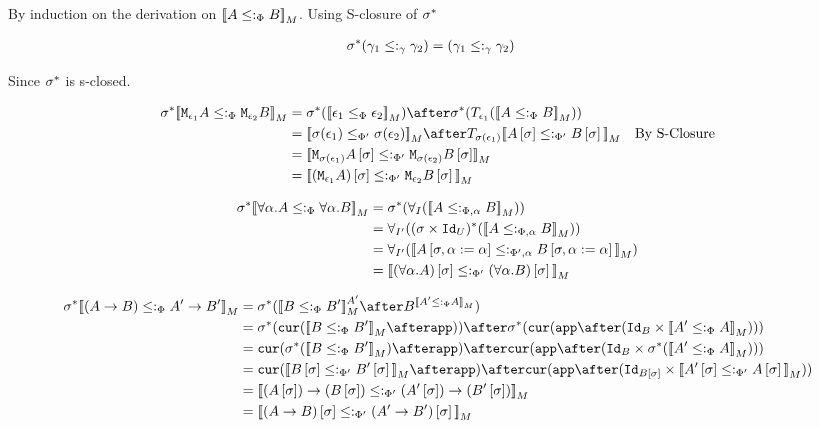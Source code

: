 \documentclass{report}
\newcommand{\allI}[0]{\forall_I}
\newcommand{\allII}[0]{\forall_{I'}}
\renewcommand\star[0]{^*}
\newcommand\subtypeg[0]{\subtype_\g}
\newcommand\subtypepa[0]{\subtype_{\P, \a}}
\newcommand\subtypeppa[0]{\subtype_{\P', \a}}
\begin{document}
\proof
By induction on the derivation on ${\bf [\![}A\leq:_\Phi B{\bf ]\!]}_M$. Using S-closure of $\si\star$ 

\begin{align}
    \si\star(\g_1\subtypeg\g_2) &= (\g_1\subtypeg\g_2)
\end{align}

Since $\si\star$ is s-closed.

\begin{align}
    \si\star\deno{\M{\e_1}{A} \subtypep \M{\e_2}{B}} & = \si\star(\deno{\e_1\subeffectp\e_2})\after\si\star(\T{\e_1}(\deno{A\subtypep B})) \\ 
     &= \deno{\si(\e_1)\subeffectpp\si(\e_2)} \after \T{\si(\e_1)}{\deno{A\ssi\subtypepp B\ssi}}\qt{By S-Closure}\\
     &= \deno{\M{\si(\e_1)}{A\ssi}\subtypepp\M{\si(\e_2)}{B\ssi}}\\
     &= \deno{(\M{\e_1}{A})\ssi\subtypepp\M{\e_2}{B}\ssi}\\
\end{align}

    \begin{align}
        \si\star\deno{\all{\a}{A}\subtypep\all{\a}{B}} &= \si\star(\allI(\deno{A\subtypepa B})) \\
        &=\allII((\si\times\Id{U})\star(\deno{A\subtypepa B}))\\
        &=\allII(\deno{A\sub{\si,\a\setto\a}\subtypeppa B\sub{\si,\a\setto\a}})\\
        &= \deno{(\all{\a}{A})\ssi \subtypepp(\all{\a}{B})\ssi}\\
    \end{align}

\begin{align}
    \si\star\deno{(\ab)\subtypep\fntype{A'}{B'}} &= \si\star(\deno{B\subtypep B'}^{A'}\after B^{\deno{A'\subtypep A}})\\
    &= \si\star(\cur{\deno{B\subtypep B'}\after\app})\after\si\star(\cur{\app\after(\Id{B}\times\deno{A'\subtypep A})})\\
    & = \cur{\si\star(\deno{B\subtypep B'})\after\app}\after\cur{\app\after(\Id{B}\times\si\star(\deno{A'\subtypep A}))}\\
    & = \cur{\deno{B\ssi\subtypepp B'\ssi}\after\app}\after\cur{\app\after(\Id{B\ssi}\times\deno{A'\ssi\subtypepp A\ssi})}\\
    &= \deno{\fntype{(A\ssi)}{(B\ssi)}\subtypepp\fntype{(A'\ssi)}{(B'\ssi)}}\\
    &= \deno{(\ab)\ssi\subtypepp(\fntype{A'}{B'})\ssi}
\end{align}
\end{document}
